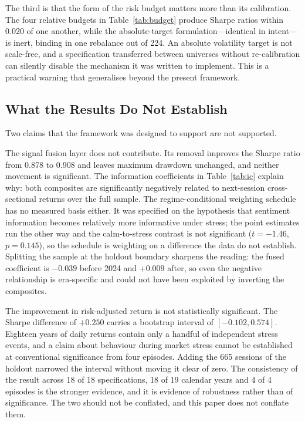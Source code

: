 \documentclass{singlecol-new}
\theoremstyle{TH}{
\newtheorem{lemma}{Lemma}
\newtheorem{theorem}[lemma]{Theorem}
\newtheorem{corrolary}[lemma]{Corrolary}
\newtheorem{conjecture}[lemma]{Conjecture}
\newtheorem{proposition}[lemma]{Proposition}
\newtheorem{claim}[lemma]{Claim}
\newtheorem{stheorem}[lemma]{Wrong Theorem}
\newtheorem{algorithm}{Algorithm}
}
\theoremstyle{THrm}{
\newtheorem{definition}{Definition}[section]
\newtheorem{question}{Question}[section]
\newtheorem{remark}{Remark}
\newtheorem{scheme}{Scheme}
}
\theoremstyle{THhit}{
\newtheorem{case}{Case}[section]
}
\begin{document}
The third is that the form of the risk budget matters more than its calibration. The
four relative budgets in Table~\ref{tab:budget} produce Sharpe ratios within 0.020 of one another,
while the absolute-target formulation---identical in intent---is inert, binding in one
rebalance out of 224. An absolute volatility target is not scale-free, and a
specification transferred between universes without re-calibration can silently disable
the mechanism it was written to implement. This is a practical warning that generalises
beyond the present framework.

\subsection{What the Results Do Not Establish}

Two claims that the framework was designed to support are not supported.

The signal fusion layer does not contribute. Its removal improves the Sharpe ratio from
0.878 to 0.908 and leaves maximum drawdown unchanged, and neither movement is
significant. The information coefficients in Table~\ref{tab:ic} explain why: both composites are
significantly negatively related to next-session cross-sectional returns over the full
sample. The regime-conditional weighting schedule has no measured basis either. It was
specified on the hypothesis that sentiment information becomes relatively more
informative under stress; the point estimates run the other way and the calm-to-stress
contrast is not significant ($t = -1.46$, $p = 0.145$), so the schedule is weighting on a
difference the data do not establish. Splitting the sample at the holdout boundary
sharpens the reading: the fused coefficient is $-0.039$ before 2024 and $+0.009$ after,
so even the negative relationship is era-specific and could not have been exploited by
inverting the composites.

The improvement in risk-adjusted return is not statistically significant. The Sharpe
difference of $+0.250$ carries a bootstrap interval of $[-0.102, 0.574]$. Eighteen years
of daily returns contain only a handful of independent stress events, and a claim about
behaviour during market stress cannot be established at conventional significance from
four episodes. Adding the 665 sessions of the holdout narrowed the interval without
moving it clear of zero. The consistency of the result across 18 of 18 specifications,
18 of 19 calendar years and 4 of 4 episodes is the stronger evidence, and it is evidence of
robustness rather than of significance. The two should not be conflated, and this paper
does not conflate them.
\end{document}
